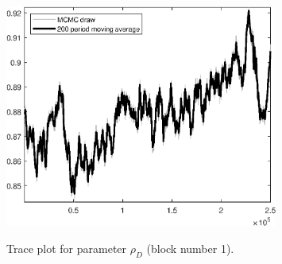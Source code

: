 \begin{figure}[H]
\centering
  \includegraphics[width=0.8\textwidth]{BRS_comovement/graphs/TracePlot_rho_D_blck_1}\\
    \caption{Trace plot for parameter ${\rho_D}$ (block number 1).}
\end{figure}

